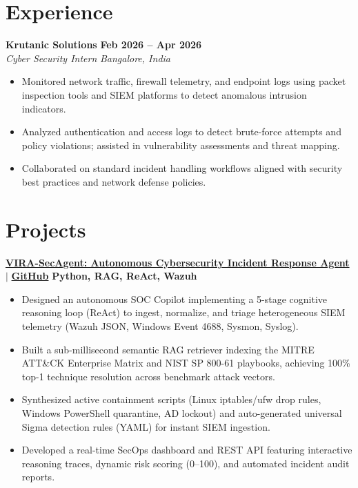 \documentclass[a4paper,10pt]{article}
\begin{document}
\section{Experience}
\noindent\textbf{Krutanic Solutions} \hfill \textbf{Feb 2026 -- Apr 2026}\\
\textit{Cyber Security Intern} \hfill \textit{Bangalore, India}
\begin{itemize}
    \item Monitored network traffic, firewall telemetry, and endpoint logs using packet inspection tools and SIEM platforms to detect anomalous intrusion indicators.
    \item Analyzed authentication and access logs to detect brute-force attempts and policy violations; assisted in vulnerability assessments and threat mapping.
    \item Collaborated on standard incident handling workflows aligned with security best practices and network defense policies.
\end{itemize}

\section{Projects}
\noindent\textbf{\href{https://github.com/keerthanreddy08/VIRA-SecAgent}{VIRA-SecAgent: Autonomous Cybersecurity Incident Response Agent}} $|$ \href{https://github.com/keerthanreddy08/VIRA-SecAgent}{\textbf{GitHub}} \hfill \textbf{Python, RAG, ReAct, Wazuh}
\begin{itemize}
    \item Designed an autonomous SOC Copilot implementing a 5-stage cognitive reasoning loop (ReAct) to ingest, normalize, and triage heterogeneous SIEM telemetry (Wazuh JSON, Windows Event 4688, Sysmon, Syslog).
    \item Built a sub-millisecond semantic RAG retriever indexing the MITRE ATT\&CK Enterprise Matrix and NIST SP 800-61 playbooks, achieving 100\% top-1 technique resolution across benchmark attack vectors.
    \item Synthesized active containment scripts (Linux iptables/ufw drop rules, Windows PowerShell quarantine, AD lockout) and auto-generated universal Sigma detection rules (YAML) for instant SIEM ingestion.
    \item Developed a real-time SecOps dashboard and REST API featuring interactive reasoning traces, dynamic risk scoring (0--100), and automated incident audit reports.
\end{itemize}
\end{document}
